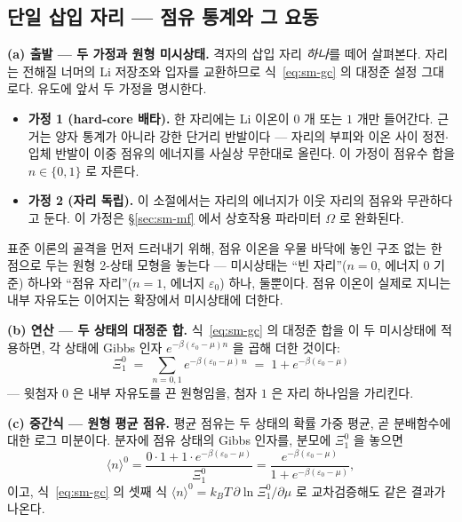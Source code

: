 \subsection{단일 삽입 자리 --- 점유 통계와 그 요동}\label{sec:sm-site}
\textbf{(a) 출발 --- 두 가정과 원형 미시상태.} 격자의 삽입 자리 \emph{하나}를 떼어 살펴본다. 자리는
전해질 너머의 Li 저장조와 입자를 교환하므로 식~\eqref{eq:sm-gc} 의 대정준 설정 그대로다. 유도에 앞서 두
가정을 명시한다.
\begin{itemize}[leftmargin=2.2em,itemsep=0.1em]
\item \textbf{가정 1 (hard-core 배타).} 한 자리에는 Li 이온이 $0$ 개 또는 $1$ 개만 들어간다. 근거는 양자
통계가 아니라 강한 단거리 반발이다 --- 자리의 부피와 이온 사이 정전$\cdot$입체 반발이 이중 점유의 에너지를
사실상 무한대로 올린다. 이 가정이 점유수 합을 $n\in\{0,1\}$ 로 자른다.
\item \textbf{가정 2 (자리 독립).} 이 소절에서는 자리의 에너지가 이웃 자리의 점유와 무관하다고 둔다. 이
가정은 \S\ref{sec:sm-mf} 에서 상호작용 파라미터 $\Omega$ 로 완화된다.
\end{itemize}
표준 이론의 골격을 먼저 드러내기 위해, 점유 이온을 우물 바닥에 놓인 구조 없는 한 점으로 두는 원형 2-상태
모형을 놓는다 --- 미시상태는 ``빈 자리''($n=0$, 에너지 $0$ 기준) 하나와 ``점유 자리''($n=1$, 에너지
$\varepsilon_0$) 하나, 둘뿐이다. 점유 이온이 실제로 지니는 내부 자유도는 이어지는 확장에서 미시상태에 더한다.

\textbf{(b) 연산 --- 두 상태의 대정준 합.} 식~\eqref{eq:sm-gc} 의 대정준 합을 이 두 미시상태에 적용하면,
각 상태에 Gibbs 인자 $e^{-\beta(\varepsilon_0-\mu)n}$ 을 곱해 더한 것이다:
\begin{equation}
\Xi_1^{0}\;=\;\sum_{n=0,1}e^{-\beta(\varepsilon_0-\mu)\,n}\;=\;1+e^{-\beta(\varepsilon_0-\mu)}
\label{eq:sm-barexi}
\end{equation}
--- 윗첨자 $0$ 은 내부 자유도를 끈 원형임을, 첨자 $1$ 은 자리 하나임을 가리킨다.

\textbf{(c) 중간식 --- 원형 평균 점유.} 평균 점유는 두 상태의 확률 가중 평균, 곧 분배함수에 대한 로그
미분이다. 분자에 점유 상태의 Gibbs 인자를, 분모에 $\Xi_1^{0}$ 을 놓으면
\begin{equation}
\langle n\rangle^{0}=\frac{0\cdot1+1\cdot e^{-\beta(\varepsilon_0-\mu)}}{\Xi_1^{0}}
=\frac{e^{-\beta(\varepsilon_0-\mu)}}{1+e^{-\beta(\varepsilon_0-\mu)}},
\label{eq:sm-baremid}
\end{equation}
이고, 식~\eqref{eq:sm-gc} 의 셋째 식 $\langle n\rangle^{0}=k_BT\,\partial\ln\Xi_1^{0}/\partial\mu$ 로
교차검증해도 같은 결과가 나온다.

